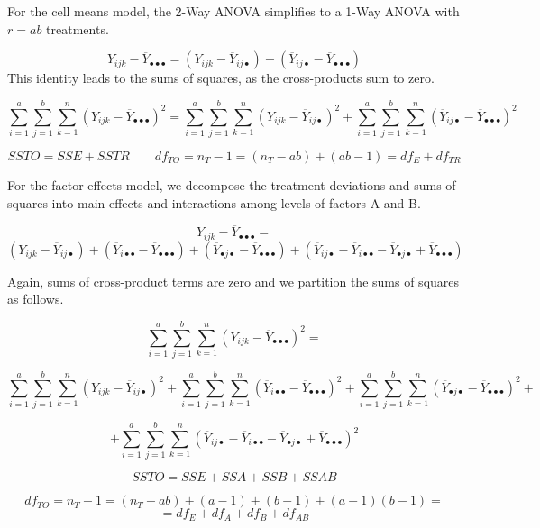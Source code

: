 \documentclass[
]{book}
\begin{document}
For the cell means model, the 2-Way ANOVA simplifies to a 1-Way ANOVA
with \(r=ab\) treatments.

\[
Y_{ijk}-\overline{Y}_{\bullet\bullet\bullet} =
\left(Y_{ijk}-\overline{Y}_{ij\bullet}\right)+
\left(\overline{Y}_{ij\bullet}-
      \overline{Y}_{\bullet\bullet\bullet}\right)
\] This identity leads to the sums of squares, as the cross-products sum
to zero.

\[
\sum_{i=1}^a\sum_{j=1}^b\sum_{k=1}^n
\left(Y_{ijk}-\overline{Y}_{\bullet\bullet\bullet}\right)^2
=
\sum_{i=1}^a\sum_{j=1}^b\sum_{k=1}^n
\left(Y_{ijk}-\overline{Y}_{ij\bullet}\right)^2
+
\sum_{i=1}^a\sum_{j=1}^b\sum_{k=1}^n
\left(\overline{Y}_{ij\bullet}-
      \overline{Y}_{\bullet\bullet\bullet}\right)^2
\]

\[
SSTO=SSE+SSTR \qquad df_{TO}=n_T-1=\left(n_T-ab\right) +
\left(ab-1\right)=df_E + df_{TR}
\]

For the factor effects model, we decompose the treatment deviations and
sums of squares into main effects and interactions among levels of
factors A and B.

\[
Y_{ijk}-\overline{Y}_{\bullet\bullet\bullet} =
\] \[
\left(Y_{ijk}-\overline{Y}_{ij\bullet}\right) +
\left(\overline{Y}_{i\bullet\bullet}-
\overline{Y}_{\bullet\bullet\bullet}\right) +
\left(\overline{Y}_{\bullet j \bullet}-
\overline{Y}_{\bullet\bullet\bullet}\right) +
\left(\overline{Y}_{ij\bullet}-
      \overline{Y}_{i\bullet\bullet} -
      \overline{Y}_{\bullet j \bullet} +
      \overline{Y}_{\bullet\bullet\bullet}\right)
\]

Again, sums of cross-product terms are zero and we partition the sums of
squares as follows.

\[
\sum_{i=1}^a\sum_{j=1}^b\sum_{k=1}^n
\left(Y_{ijk}-\overline{Y}_{\bullet\bullet\bullet}\right)^2
=
\]

\[
\sum_{i=1}^a\sum_{j=1}^b\sum_{k=1}^n
\left(Y_{ijk}-\overline{Y}_{ij\bullet}\right)^2 +
\sum_{i=1}^a\sum_{j=1}^b\sum_{k=1}^n
\left(\overline{Y}_{i\bullet\bullet}-
\overline{Y}_{\bullet\bullet\bullet}\right)^2 +
\sum_{i=1}^a\sum_{j=1}^b\sum_{k=1}^n
\left(\overline{Y}_{\bullet j \bullet}-
\overline{Y}_{\bullet\bullet\bullet}\right)^2 +
\]

\[
+ \sum_{i=1}^a\sum_{j=1}^b\sum_{k=1}^n
\left(\overline{Y}_{ij\bullet}-
      \overline{Y}_{i\bullet\bullet} -
      \overline{Y}_{\bullet j \bullet} +
      \overline{Y}_{\bullet\bullet\bullet}\right)^2
\]

\[
SSTO = SSE + SSA + SSB + SSAB
\]

\[
df_{TO}=n_T-1 = \left(n_T-ab\right) + (a-1) + (b-1) + (a-1)(b-1)=
\] \[
=df_E + df_A + df_B + df_{AB}
\]
\end{document}
